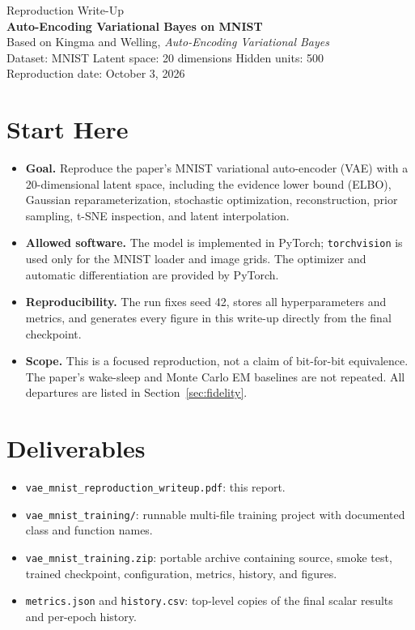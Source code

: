 \documentclass[11pt]{article}
\newcommand{\code}[1]{\texttt{#1}}
\begin{document}
\begin{center}
  {\Large Reproduction Write-Up}\\[0.35em]
  {\LARGE\bfseries Auto-Encoding Variational Bayes on MNIST}\\[0.85em]
  {\large Based on Kingma and Welling, \emph{Auto-Encoding Variational Bayes}}\\[0.5em]
  {\normalsize Dataset: MNIST \quad Latent space: 20 dimensions \quad Hidden units: 500}\\[0.2em]
  {\normalsize Reproduction date: October 3, 2026}
\end{center}

\vspace{0.6em}
\section*{Start Here}

\begin{itemize}
  \item \textbf{Goal.} Reproduce the paper's MNIST variational auto-encoder (VAE) with a 20-dimensional latent space, including the evidence lower bound (ELBO), Gaussian reparameterization, stochastic optimization, reconstruction, prior sampling, t-SNE inspection, and latent interpolation.
  \item \textbf{Allowed software.} The model is implemented in PyTorch; \code{torchvision} is used only for the MNIST loader and image grids. The optimizer and automatic differentiation are provided by PyTorch.
  \item \textbf{Reproducibility.} The run fixes seed 42, stores all hyperparameters and metrics, and generates every figure in this write-up directly from the final checkpoint.
  \item \textbf{Scope.} This is a focused reproduction, not a claim of bit-for-bit equivalence. The paper's wake-sleep and Monte Carlo EM baselines are not repeated. All departures are listed in Section~\ref{sec:fidelity}.
\end{itemize}

\vspace{0.3em}
\section*{Deliverables}

\begin{itemize}
  \item \code{vae\_mnist\_reproduction\_writeup.pdf}: this report.
  \item \code{vae\_mnist\_training/}: runnable multi-file training project with documented class and function names.
  \item \code{vae\_mnist\_training.zip}: portable archive containing source, smoke test, trained checkpoint, configuration, metrics, history, and figures.
  \item \code{metrics.json} and \code{history.csv}: top-level copies of the final scalar results and per-epoch history.
\end{itemize}
\end{document}
